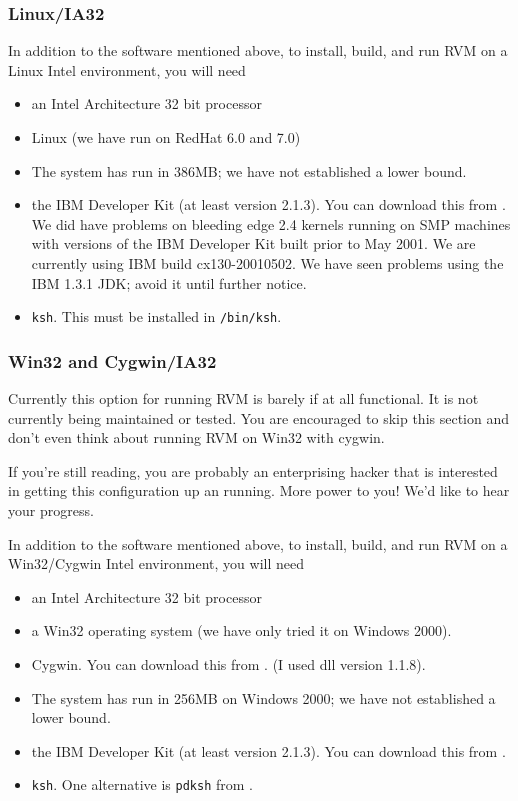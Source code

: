 \subsubsection{Linux/IA32}
In addition to the software mentioned above, to install, build, and
run RVM on a Linux Intel environment, you will need 
\begin{itemize}
\item an Intel Architecture 32 bit processor
\item Linux  (we have run on RedHat 6.0 and 7.0)
\item The system has run in 386MB; we have not established a lower bound.
\item the IBM Developer Kit (at least version 2.1.3).  You can
download this from 
\xlink{{\tt \LinuxJdkURL}} {\LinuxJdkURL}.  We did have problems on
bleeding edge 2.4 kernels running on SMP machines with versions of the IBM
Developer Kit built prior to May 2001.  We are currently using IBM
build cx130-20010502.  We have seen problems using the IBM 1.3.1 JDK;
avoid it until further notice.
\item {\tt ksh}. This must be installed in {\tt /bin/ksh}.
\end{itemize}

\subsubsection{Win32 and Cygwin/IA32}
Currently this option for running RVM is barely if at all functional.
It is not currently being maintained or tested. You are encouraged to 
skip this section and don't even think about running RVM on Win32 with 
cygwin.

If you're still reading, you are probably an enterprising hacker that is
interested in getting this configuration up an running.  More power to
you! We'd like to hear your progress.

In addition to the software mentioned above, to install, build, and
run RVM on a Win32/Cygwin Intel environment, you will need 
\begin{itemize}
\item an Intel Architecture 32 bit processor
\item a Win32 operating system (we have only tried it on Windows 2000).
\item Cygwin. You can download this from 
\xlink{{\tt \CygwinURL}} {\CygwinURL}. (I used dll version 1.1.8).
\item The system has run in 256MB on Windows 2000; we have not established
a lower bound.
\item the IBM Developer Kit (at least version 2.1.3).  You can download this from
\xlink{{\tt \WinJdkURL}} {\WinJdkURL}.
\item {\tt ksh}.  One alternative is {\tt pdksh} from 
\xlink{{\tt \pdkshURL}} {\pdkshURL}.
\end{itemize}

